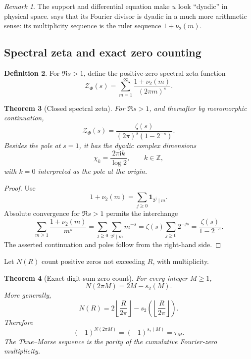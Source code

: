 \documentclass[11pt,oneside]{article}
\newtheorem{theorem}{Theorem}[section]
\theoremstyle{definition}
\newtheorem{definition}[theorem]{Definition}
\theoremstyle{remark}
\newtheorem{remark}[theorem]{Remark}
\newcommand{\Z}{\mathbb Z}
\newcommand{\ii}{\mathrm i}
\begin{document}
\begin{remark}
The support and differential equation make \(u\) look ``dyadic'' in physical
space.   says that its Fourier divisor is dyadic in a much
more arithmetic sense: its multiplicity sequence is the ruler sequence
\(1+\nu_2(m)\).
\end{remark}

\subsection{Spectral zeta and exact zero counting}

\begin{definition}
For \(\Re s>1\), define the positive-zero spectral zeta function
\begin{equation}
 \mathcal Z_\Phi(s)
 =\sum_{m=1}^{\infty}
   \frac{1+\nu_2(m)}{(2\pi m)^s}.
 \label{eq:spectral-zeta-def}
\end{equation}
\end{definition}

\begin{theorem}[Closed spectral zeta]
\label{thm:spectral-zeta}
For \(\Re s>1\), and thereafter by meromorphic continuation,
\begin{equation}
 \boxed{\displaystyle
 \mathcal Z_\Phi(s)
 =\frac{\zeta(s)}{(2\pi)^s(1-2^{-s})}.}
 \label{eq:spectral-zeta}
\end{equation}
Besides the pole at \(s=1\), it has the dyadic complex dimensions
\begin{equation}
 \chi_k=\frac{2\pi\ii k}{\log2},
 \qquad k\in\Z,
 \label{eq:complex-dimensions}
\end{equation}
with \(k=0\) interpreted as the pole at the origin.
\end{theorem}

\begin{proof}
Use
\[
 1+\nu_2(m)=\sum_{j\geq0}\mathbf1_{2^j\mid m}.
\]
Absolute convergence for \(\Re s>1\) permits the interchange
\[
 \sum_{m\geq1}\frac{1+\nu_2(m)}{m^s}
 =\sum_{j\geq0}\sum_{2^j\mid m}m^{-s}
 =\zeta(s)\sum_{j\geq0}2^{-js}
 =\frac{\zeta(s)}{1-2^{-s}}.
\]
The asserted continuation and poles follow from the right-hand side.
\end{proof}

Let \(N(R)\) count positive zeros not exceeding \(R\), with multiplicity.

\begin{theorem}[Exact digit-sum zero count]
\label{thm:zero-count}
For every integer \(M\geq1\),
\begin{equation}
 \boxed{\displaystyle
 N(2\pi M)=2M-s_2(M).}
 \label{eq:zero-count}
\end{equation}
More generally,
\[
 N(R)=2\left\lfloor\frac{R}{2\pi}\right\rfloor
      -s_2\!\left(\left\lfloor\frac{R}{2\pi}\right\rfloor\right).
\]
Therefore
\begin{equation}
 (-1)^{N(2\pi M)}=(-1)^{s_2(M)}=\tau_M.
 \label{eq:TM-spectral-parity}
\end{equation}
The Thue--Morse sequence is the parity of the cumulative Fourier-zero
multiplicity.
\end{theorem}
\end{document}
